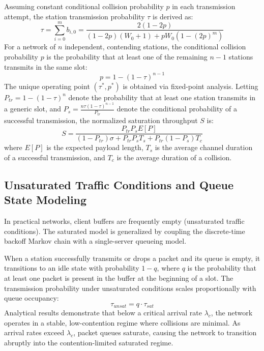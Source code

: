 Assuming constant conditional collision probability $p$ in each transmission attempt, the station transmission probability $\tau$ is derived as:
\begin{equation}
    \tau = \sum_{i=0}^m b_{i,0} = \frac{2(1 - 2p)}{(1 - 2p)(W_0 + 1) + p W_0 (1 - (2p)^m)}
\end{equation}
For a network of $n$ independent, contending stations, the conditional collision probability $p$ is the probability that at least one of the remaining $n - 1$ stations transmits in the same slot:
\begin{equation}
    p = 1 - (1 - \tau)^{n - 1}
\end{equation}
The unique operating point $(\tau^*, p^*)$ is obtained via fixed-point analysis. Letting $P_{tr} = 1 - (1 - \tau)^n$ denote the probability that at least one station transmits in a generic slot, and $P_s = \frac{n \tau (1 - \tau)^{n-1}}{P_{tr}}$ denote the conditional probability of a successful transmission, the normalized saturation throughput $S$ is:
\begin{equation}
    S = \frac{P_{tr} P_s E[P]}{(1 - P_{tr})\sigma + P_{tr} P_s T_s + P_{tr} (1 - P_s) T_c}
\end{equation}
where $E[P]$ is the expected payload length, $T_s$ is the average channel duration of a successful transmission, and $T_c$ is the average duration of a collision.

\subsection{Unsaturated Traffic Conditions and Queue State Modeling}
In practical networks, client buffers are frequently empty (unsaturated traffic conditions). The saturated model is generalized by coupling the discrete-time backoff Markov chain with a single-server queueing model. 

When a station successfully transmits or drops a packet and its queue is empty, it transitions to an idle state with probability $1 - q$, where $q$ is the probability that at least one packet is present in the buffer at the beginning of a slot. The transmission probability under unsaturated conditions scales proportionally with queue occupancy:
\begin{equation}
    \tau_{unsat} = q \cdot \tau_{sat}
\end{equation}
Analytical results demonstrate that below a critical arrival rate $\lambda_c$, the network operates in a stable, low-contention regime where collisions are minimal. As arrival rates exceed $\lambda_c$, packet queues saturate, causing the network to transition abruptly into the contention-limited saturated regime.

